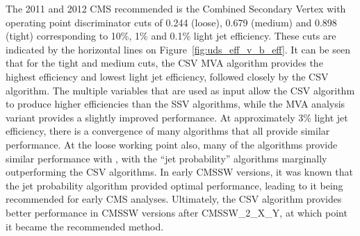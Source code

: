 The 2011 and 2012 CMS recommended \btagger is the Combined Secondary Vertex with operating point discriminator
cuts of 0.244 (loose), 0.679 (medium) and 0.898 (tight) corresponding to 10\%, 1\% and 0.1\% light jet
efficiency. These cuts are indicated by the horizontal lines on Figure~\ref{fig:uds_eff_v_b_eff}. It can be
seen that for the tight and medium cuts, the CSV MVA algorithm provides the highest \bjet efficiency and
lowest light jet efficiency, followed closely by the CSV algorithm. The multiple variables that are used as
input allow the CSV algorithm to produce higher efficiencies than the SSV algorithms, while the MVA analysis
variant provides a slightly improved performance. At approximately 3\% light jet efficiency, there is a
convergence of many algorithms that all provide similar performance. At the loose working point also, many of
the algorithms provide similar performance with \bjets, with the ``jet probability'' algorithms marginally
outperforming the CSV algorithms. In early CMSSW versions, it was known that the jet probability algorithm
provided optimal performance, leading to it being recommended for early CMS analyses.
Ultimately, the CSV algorithm provides better performance in CMSSW versions after CMSSW\_2\_X\_Y, at which
point it became the recommended \btagging method.
